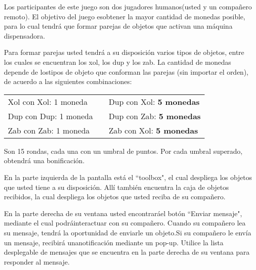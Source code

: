 \documentclass{article}
\begin{document}
\vfill

\begin{multicols}{2}{
\noindent Los participantes de este juego son dos jugadores humanos\linebreak (usted y un compañero remoto). El objetivo del juego es\linebreak obtener la mayor cantidad de monedas posible, para lo cual tendrá que formar parejas de objetos que activan una máquina dispensadora. 

\vspace{0.5\baselineskip}

\noindent Para formar parejas usted tendrá a su disposición varios tipos de objetos, entre los cuales se encuentran los xol, los dup y los zab. La cantidad de monedas depende de los\linebreak tipos de objeto que conforman las parejas (sin importar el orden), de acuerdo a las siguientes combinaciones:

\vspace{-0.25\baselineskip}

\noindent\begin{tabular}{lcl}\\
Xol con Xol: 1 moneda && Dup con Xol: \textbf{5 monedas}\\
Dup con Dup: 1 moneda && Dup con Zab: \textbf{5 monedas}\\
Zab con Zab: 1 moneda && Zab con Xol: \textbf{5 monedas}\\
\end{tabular}

\vspace{0.5\baselineskip}

\noindent Son 15 rondas, cada una con un umbral de puntos. Por cada umbral superado, obtendrá una bonificación.

\vspace{0.5\baselineskip}

\noindent En la parte izquierda de la pantalla está el ``toolbox", el cual despliega los objetos que usted tiene a su disposición. Allí también encuentra la caja de objetos recibidos, la cual despliega los objetos que usted reciba de su compañero.

\vspace{0.5\baselineskip}

\noindent En la parte derecha de su ventana usted encontrará\linebreak  el botón ``Enviar mensaje", mediante el cual podrá\linebreak  interactuar con su compañero. Cuando su compañero lea su mensaje, tendrá la oportunidad de enviarle un objeto.\linebreak  Si su compañero le envía un mensaje, recibirá una\linebreak  notificación mediante un pop-up. Utilice la lista desplegable de mensajes que se encuentra en la parte derecha de su ventana para responder al mensaje.
}\end{multicols}
\end{document}
